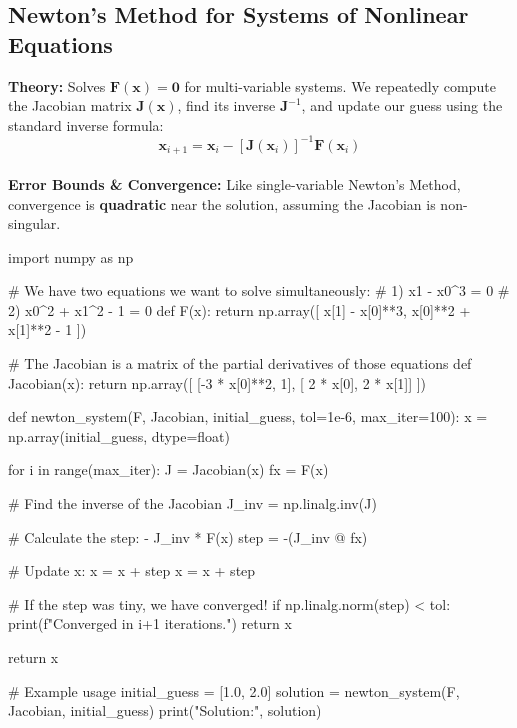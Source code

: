 \documentclass{article}
\begin{document}
\subsection{Newton's Method for Systems of Nonlinear Equations}
\textbf{Theory:} Solves $\mathbf{F}(\mathbf{x}) = \mathbf{0}$ for multi-variable systems. We repeatedly compute the Jacobian matrix $\mathbf{J}(\mathbf{x})$, find its inverse $\mathbf{J}^{-1}$, and update our guess using the standard inverse formula:
$$ \mathbf{x}_{i+1} = \mathbf{x}_i - [\mathbf{J}(\mathbf{x}_i)]^{-1} \mathbf{F}(\mathbf{x}_i) $$ \\
\textbf{Error Bounds \& Convergence:} Like single-variable Newton's Method, convergence is \textbf{quadratic} near the solution, assuming the Jacobian is non-singular.

\begin{jupytercode}
import numpy as np

# We have two equations we want to solve simultaneously:
# 1) x1 - x0^3 = 0
# 2) x0^2 + x1^2 - 1 = 0
def F(x):
    return np.array([
        x[1] - x[0]**3,
        x[0]**2 + x[1]**2 - 1
    ])

# The Jacobian is a matrix of the partial derivatives of those equations
def Jacobian(x):
    return np.array([
        [-3 * x[0]**2,  1],
        [ 2 * x[0],     2 * x[1]]
    ])

def newton_system(F, Jacobian, initial_guess, tol=1e-6, max_iter=100):
    x = np.array(initial_guess, dtype=float)
    
    for i in range(max_iter):
        J = Jacobian(x)
        fx = F(x)
        
        # Find the inverse of the Jacobian
        J_inv = np.linalg.inv(J)
        
        # Calculate the step: - J_inv * F(x)
        step = -(J_inv @ fx)
        
        # Update x: x = x + step
        x = x + step
        
        # If the step was tiny, we have converged!
        if np.linalg.norm(step) < tol:
            print(f"Converged in {i+1} iterations.")
            return x
            
    return x

# Example usage
initial_guess = [1.0, 2.0]
solution = newton_system(F, Jacobian, initial_guess)
print("Solution:", solution)
\end{jupytercode}
\end{document}
